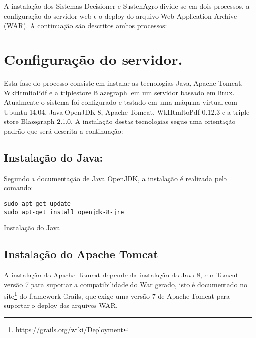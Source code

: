 A instalação dos Sistemas Decisioner e SustenAgro divide-se em dois
processos, a configuração do servidor web e o \foreignlanguage{english}{deploy}
do arquivo \foreignlanguage{english}{Web Application Archive (WAR)}.
A continuação são descritos ambos processos:

\section{Configuração do servidor.}

Esta fase do processo consiste em instalar as tecnologias Java, Apache
\foreignlanguage{english}{Tomcat}, \foreignlanguage{english}{WkHtmltoPdf}
e a \foreignlanguage{english}{triplestore} \foreignlanguage{english}{Blazegraph},
em um servidor baseado em \foreignlanguage{english}{linux}. Atualmente
o sistema foi configurado e testado em uma máquina virtual com Ubuntu
14.04, Java \foreignlanguage{english}{OpenJDK} 8, Apache \foreignlanguage{english}{Tomcat},
\foreignlanguage{english}{WkHtmltoPdf} 0.12.3 e a \foreignlanguage{english}{triplestore}
\foreignlanguage{english}{Blazegraph} 2.1.0. A instalação destas tecnologias
segue uma orientação padrão que será descrita a continuação:

\subsection*{Instalação do Java:}

Segundo a documentação de Java \foreignlanguage{english}{OpenJDK},
a instalação é realizada pelo comando:

\begin{algorithm}[h]
\begin{lstlisting}
sudo apt-get update
sudo apt-get install openjdk-8-jre
\end{lstlisting}
\caption{Instalação do Java}
\end{algorithm}


\subsection*{Instalação do \foreignlanguage{english}{Apache Tomcat}}

A instalação do \foreignlanguage{english}{Apache Tomcat} depende da
instalação do Java 8, e o \foreignlanguage{english}{Tomcat} versão
7 para suportar a compatibilidade do \foreignlanguage{english}{War}
gerado, isto é documentado no site\footnote{https://grails.org/wiki/Deployment}
do framework \foreignlanguage{english}{Grails}, que exige uma versão
7 de \foreignlanguage{english}{Apache Tomcat} para suportar o \foreignlanguage{english}{deploy}
dos arquivos \foreignlanguage{english}{WAR}.

